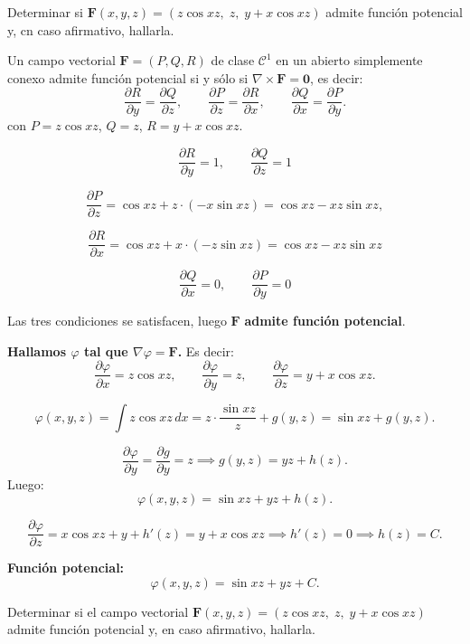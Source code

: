\begin{example} Determinar si $\mathbf{F}(x,y,z) = (z\cos xz,\; z,\; y + x\cos xz)$ admite función potencial y, cn caso afirmativo,  hallarla.

Un campo vectorial $\mathbf{F} = (P, Q, R)$
de clase $\mathcal{C}^1$ en un abierto simplemente conexo admite función potencial
si y sólo si $\nabla \times \mathbf{F} = \mathbf{0}$, es decir:
\[
    \frac{\partial R}{\partial y} = \frac{\partial Q}{\partial z}, \qquad
    \frac{\partial P}{\partial z} = \frac{\partial R}{\partial x}, \qquad
    \frac{\partial Q}{\partial x} = \frac{\partial P}{\partial y}.
\]
con $P = z\cos xz$, $Q = z$, $R = y + x\cos xz$.

\[
    \frac{\partial R}{\partial y} = 1, \qquad
    \frac{\partial Q}{\partial z} = 1
\]
 
\[
    \frac{\partial P}{\partial z} = \cos xz + z \cdot (-x\sin xz) = \cos xz - xz\sin xz,
\]

\[
    \frac{\partial R}{\partial x} = \cos xz + x \cdot (-z\sin xz) = \cos xz - xz\sin xz
\]

\[
    \frac{\partial Q}{\partial x} = 0, \qquad
    \frac{\partial P}{\partial y} = 0
\]

Las tres condiciones se satisfacen, luego $\mathbf{F}$ \textbf{admite función potencial}.

\medskip
\textbf{Hallamos $\varphi$ tal que $\nabla\varphi = \mathbf{F}$.} Es decir:
\[
    \frac{\partial \varphi}{\partial x} = z\cos xz, \qquad
    \frac{\partial \varphi}{\partial y} = z, \qquad
    \frac{\partial \varphi}{\partial z} = y + x\cos xz.
\]

\[
    \varphi(x,y,z)
    = \int z\cos xz\, dx
    = z \cdot \frac{\sin xz}{z} + g(y,z)
    = \sin xz + g(y,z).
\]

\[
    \frac{\partial \varphi}{\partial y} = \frac{\partial g}{\partial y} = z
    \implies g(y,z) = yz + h(z).
\]
Luego:
\[
    \varphi(x,y,z) = \sin xz + yz + h(z).
\]

\[
    \frac{\partial \varphi}{\partial z} = x\cos xz + y + h'(z) = y + x\cos xz
    \implies h'(z) = 0 \implies h(z) = C.
\]

\textbf{Función potencial:}
\[
    \boxed{\varphi(x,y,z) = \sin xz + yz + C.}
\]
\end{example}

\begin{example} 
Determinar si el campo vectorial $\mathbf{F}(x,y,z) = (z\cos xz,\; z,\; y + x\cos xz)$ admite función potencial y, en caso afirmativo, hallarla.
\end{example}

